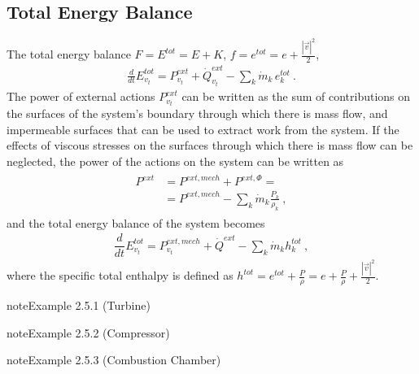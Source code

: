 \documentclass[letterpaper,10pt,english]{jupyterBook}
\begin{document}
\subsection{Total Energy Balance}
\label{\detokenize{ch/principles-open:total-energy-balance}}
\sphinxAtStartPar
The total energy balance \(F = E^{tot} = E + K\), \(f = e^{tot} = e + \frac{|\vec{v}|^2}{2}\),
\begin{equation*}
\begin{split}\frac{d}{dt} E^{tot}_{v_t} = P^{ext}_{v_t}  + \dot{Q}^{ext}_{v_t}  - \sum_k \dot{m}_k \, e^{tot}_k \ .\end{split}
\end{equation*}
\sphinxAtStartPar
The power of external actions \(P^{ext}_{v_t}\) can be written as the sum of contributions on the surfaces of the system’s boundary through which there is mass flow, and impermeable surfaces that can be used to extract work from the system. If the effects of viscous stresses on the surfaces through which there is mass flow can be neglected, the power of the actions on the system can be written as
\begin{equation*}
\begin{split}\begin{aligned}
  P^{ext} & = P^{ext,mech} + P^{ext,\Phi} = \\
          & = P^{ext,mech} - \sum_{k} \dot{m}_k \frac{P_k}{\rho_k} \ , 
\end{aligned}\end{split}
\end{equation*}
\sphinxAtStartPar
and the total energy balance of the system becomes
\begin{equation*}
\begin{split}\dfrac{d}{dt} E^{tot}_{v_t} = P^{ext,mech}_{v_t} + \dot{Q}^{ext} - \sum_k \dot{m}_k h^{tot}_k \ ,\end{split}
\end{equation*}
\sphinxAtStartPar
where the specific total enthalpy is defined as \(h^{tot} = e^{tot} + \frac{P}{\rho} = e + \frac{P}{\rho} + \frac{|\vec{v}|^2}{2}\).
\label{ch/principles-open:thermodynamics:principles:open:ex:turbine}
\begin{sphinxadmonition}{note}{Example 2.5.1 (Turbine)}


\end{sphinxadmonition}
\label{ch/principles-open:thermodynamics:principles:open:ex:compressor}
\begin{sphinxadmonition}{note}{Example 2.5.2 (Compressor)}


\end{sphinxadmonition}
\label{ch/principles-open:thermodynamics:principles:open:ex:comb-chamber}
\begin{sphinxadmonition}{note}{Example 2.5.3 (Combustion Chamber)}


\end{sphinxadmonition}
\end{document}

